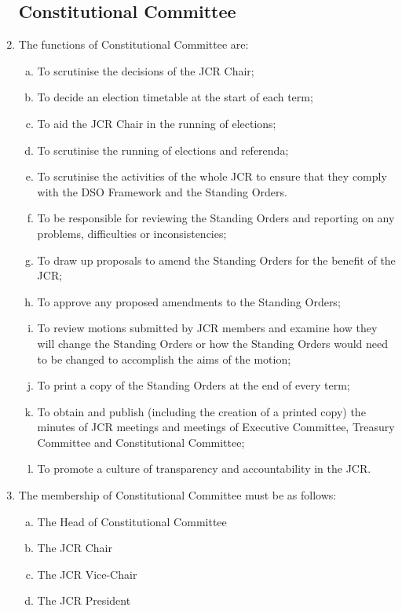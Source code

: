 \documentclass[12pt]{article}  %
\begin{document}
\begin{enumerate}
    \subsection{Constitutional Committee}
    \item The functions of Constitutional Committee are:
    \begin{enumerate}[(a)]
        \item To scrutinise the decisions of the JCR Chair;
        \item To decide an election timetable at the start of each term;
        \item To aid the JCR Chair in the running of elections;
        \item To scrutinise the running of elections and referenda;
        \item To scrutinise the activities of the whole JCR to ensure that they comply with the DSO Framework and the Standing Orders.
        \item To be responsible for reviewing the Standing Orders and reporting on any problems, difficulties or inconsistencies;
        \item To draw up proposals to amend the Standing Orders for the benefit of the JCR;
        \item To approve any proposed amendments to the Standing Orders;
        \item To review motions submitted by JCR members and examine how they will change the Standing Orders or how the Standing Orders would need to be changed to accomplish the aims of the motion;
        \item To print a copy of the Standing Orders at the end of every term;
        \item To obtain and publish (including the creation of a printed copy) the minutes of JCR meetings and meetings of Executive Committee, Treasury Committee and Constitutional Committee;
        \item To promote a culture of transparency and accountability in the JCR.
    \end{enumerate}
    \item The membership of Constitutional Committee must be as follows:
    \begin{enumerate}[(a)]
        \item The Head of Constitutional Committee
        \item The JCR Chair
        \item The JCR Vice-Chair
        \item The JCR President

\end{enumerate}
\end{enumerate}
\end{document}
